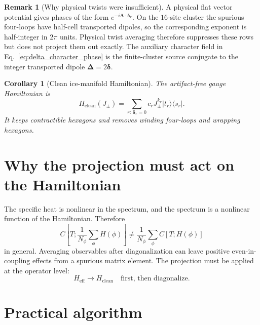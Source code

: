 \documentclass[11pt,letterpaper]{article}
\newcommand{\Jpm}{J_{\pm}}
\newcommand{\Heff}{H_{\mathrm{eff}}}
\newcommand{\Hclean}{H_{\mathrm{clean}}}
\newcommand{\bA}{\bm A}
\newcommand{\bdelta}{\bm \delta}
\newcommand{\bDelta}{\bm \Delta}
\theoremstyle{plain}
\newtheorem{corollary}{Corollary}
\theoremstyle{definition}
\newtheorem{remark}{Remark}
\begin{document}
\begin{remark}[Why physical twists were insufficient]
A physical flat vector potential gives phases of the form
$e^{-i\bA\cdot\bdelta_r}$.  On the $16$-site cluster the spurious four-loops
have half-cell transported dipoles, so the corresponding exponent is
half-integer in $2\pi$ units.  Physical twist averaging therefore suppresses
these rows but does not project them out exactly.  The auxiliary character
field in Eq.~\eqref{eq:delta_character_phase} is the finite-cluster source
conjugate to the integer transported dipole $\bDelta=2\bdelta$.
\end{remark}

\begin{corollary}[Clean ice-manifold Hamiltonian]
The artifact-free gauge Hamiltonian is
\begin{equation}
\boxed{
\Hclean(\Jpm)=
\sum_{r:\,\bdelta_r=0} c_r\Jpm^{k_r}|t_r\rangle\langle s_r| .
}
\label{eq:hclean}
\end{equation}
It keeps contractible hexagons and removes winding four-loops and wrapping
hexagons.
\end{corollary}

\section{Why the projection must act on the Hamiltonian}
\label{sec:operator-level}

The specific heat is nonlinear in the spectrum, and the spectrum is a
nonlinear function of the Hamiltonian.  Therefore
\begin{equation}
C\!\left[T;\frac1{N_\phi}\sum_\phi H(\phi)\right]
\ne
\frac1{N_\phi}\sum_\phi C[T;H(\phi)]
\end{equation}
in general.  Averaging observables after diagonalization can leave positive
even-in-coupling effects from a spurious matrix element.  The projection
must be applied at the operator level:
\begin{equation}
\Heff \longrightarrow \Hclean
\quad\text{first, then diagonalize.}
\end{equation}

\section{Practical algorithm}
\end{document}
